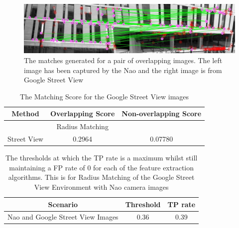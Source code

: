  \begin{figure}[h!] 
  \centering
    \includegraphics[width=1.0\textwidth]{../Drawings/Matching/GoogleStreetViewDataset.jpg}
    \caption{The matches generated for a pair of overlapping images. The left image has been captured by the Nao and the right image is from Google Street View}
    \label{fig:google_matches}
\end{figure}


\begin{table}
\centering
\caption{The Matching Score for the Google Street View images}
\begin{tabular}{|c|c|c|}
\hline 
Method & Overlapping Score & Non-overlapping Score\tabularnewline
\hline 
\hline 
 & Radius Matching & \tabularnewline
\hline 
Street View & 0.2964 & 0.07780\tabularnewline
\hline 
\end{tabular}
\label{tab:ms_google}
\end{table}

\begin{table}
\centering
\caption{The thresholds at which the TP rate is a maximum whilst still maintaining
a FP rate of 0 for each of the feature extraction algorithms. This
is for Radius Matching of the Google Street View Environment with
Nao camera images}
\begin{tabular}{|c|c|c|}
\hline 
Scenario & Threshold & TP rate\tabularnewline
\hline 
\hline 
Nao and Google Street View Images & 0.36 & 0.39\tabularnewline
\hline 
\end{tabular}
\label{tab:tp_rate_google}
\end{table}
